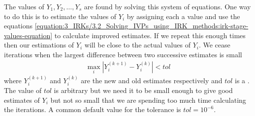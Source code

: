 \documentclass[letterpaper,10pt,english]{jupyterBook}
\begin{document}
\sphinxAtStartPar
The values of \(Y_1, Y_2, \ldots, Y_s\) are found by solving this system of equations. One way to do this is to estimate the values of \(Y_i\) by assigning each a value and use the equations \eqref{equation:3_IRKs/3.2_Solving_IVPs_using_IRK_methods:irk-stage-values-equation} to calculate improved estimates. If we repeat this enough times then our estimations of \(Y_i\) will be close to the actual values of \(Y_i\). We cease iterations when the largest difference between two successive estimates is small
\begin{equation*}
\begin{split}\max_i| Y_i^{(k+1)} - Y_i^{(k)}| < tol\end{split}
\end{equation*}
\sphinxAtStartPar
where \(Y_i^{(k+1)}\) and \(Y_i^{(k)}\) are the new and old estimates respectively and \(tol\) is a . The value of \(tol\) is arbitrary but we need it to be small enough to give good estimates of \(Y_i\) but not so small that we are spending too much time calculating the iterations. A common default value for the tolerance is \(tol=10^{-6}\).
\end{document}
